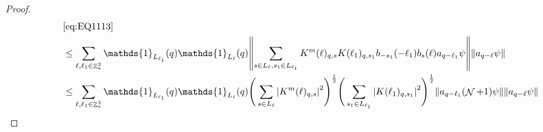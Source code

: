 \documentclass[sn-mathphys, Numbered ,a4paper]{sn-jnl}%
\DeclareMathOperator{\Z}{\mathbb{Z}}
\DeclareMathOperator{\NN}{\mathcal{N}}
\newcommand{\half}{\frac{1}{2}}
\theoremstyle{plain}
\theoremstyle{definition}
\theoremstyle{remark}
\theoremstyle{plain}
\theoremstyle{definition}
\theoremstyle{remark}
\begin{document}
\begin{proof}
\begin{comment}
		&\leq\sum\limits_{\ell, \ell_1\in \Z^3_*} \mathds{1}_{L_{\ell_1}}(q) \mathds{1}_{L_{\ell}}(q) \Bigg(\sum\limits_{s \in L_{\ell}} \abs{K^m(\ell)_{q,s}}^2\Bigg)^\half \Bigg(\sum\limits_{s_1 \in L_{\ell_1}} \abs{K(\ell_1)_{q,s_1}}^2\Bigg)^\half \Bigg(\sum\limits_{s_1 \in L_{\ell_1}}\norm{  b_{-s_1}(-\ell_1) a_{q-\ell_1} \NN^\half\psi}^2\Bigg)^\half \norm{ a_{q-\ell}\psi }\nonumber\\
		&\leq\sum\limits_{\ell \in \Z^3_*} \mathds{1}_{L_{\ell}}(q) \Bigg(\sum\limits_{s \in L_{\ell}} \abs{K^m(\ell)_{q,s}}^2 \Bigg)^\half \Bigg(\sum\limits_{\ell_1 \in \Z^3_*}  \mathds{1}_{L_{\ell_1}}(q) \sum\limits_{s_1 \in L_{\ell_1}} \abs{K(\ell_1)_{q,s_1}}^2 \Bigg)^\half \times \nonumber\\ 
		&\quad \times \Bigg(\sum\limits_{\ell_1 \in \Z^3_*} \mathds{1}_{L_{\ell_1}}(q) \sum\limits_{s_1\in L_{\ell_1}} \norm{ a_{-s_1+\ell_1} a_{-s_1} a_{q-\ell_1} \NN^\half\psi}^2\Bigg)^\half \norm{ a_{q-\ell}\psi }\nonumber\\
		&\leq\sum\limits_{\ell \in \Z^3_*} \norm{  K^{m}(\ell)}_{\mathrm{max,2}}  \Bigg(\sum\limits_{\ell_1 \in \Z^3_*} \norm{K(\ell_1)}_{\mathrm{max,2}}^2 \Bigg)^\half \sup_{q \in \Z^3}\norm{ a_{q} \NN^{\frac{3}{2}}\psi}\Xi^\half \nonumber\\
		&\leq  C \,\Xi^\half \left(\sum\limits_{\ell \in \Z^3_*} \norm{K^m(\ell)}_{\mathrm{max,2}}\right)\Bigg(\sum\limits_{\ell_1 \in \Z^3_*} \norm{K(\ell_1)}_{\mathrm{max,2}}^2 \Bigg)^\half \sup_{q \in \Z^3}\norm{ a_{q} \psi}^\half \norm{ \NN^{\frac{3}{2}}\psi}^\half \nonumber\\
		&\leq  C \,\Xi^{\frac{3}{4}} \left(\sum\limits_{\ell \in \Z^3_*} \norm{K^m(\ell)}_{\mathrm{max,2}}\right)\Bigg(\sum\limits_{\ell_1 \in \Z^3_*} \norm{K(\ell_1)}_{\mathrm{max,2}}^2 \Bigg)^\half  \norm{ \NN^{\frac{3}{2}}\psi}^\half \label{eq:estEQ1113}
	\end{align}
\end{comment}
\begin{align}
	&\eqref{eq:EQ1113}\nonumber\\
	&\leq\sum\limits_{\ell, \ell_1\in \Z^3_*} \mathds{1}_{L_{\ell_1}}(q) \mathds{1}_{L_{\ell}}(q)  \norm{ \sum\limits_{s\in L_{\ell}, s_1 \in L_{\ell_1}} K^m(\ell)_{q,s}K(\ell_1)_{q,s_1} b_{-s_1}(-\ell_1) b_{s}(\ell) a_{q-\ell_1}\psi}\norm{ a_{q-\ell}\psi }\nonumber\\
	&\leq\sum\limits_{\ell, \ell_1\in \Z^3_*} \mathds{1}_{L_{\ell_1}}(q) \mathds{1}_{L_{\ell}}(q) \Bigg(\sum\limits_{s \in L_{\ell}} \abs{K^m(\ell)_{q,s}}^2\Bigg)^\half \Bigg(\sum\limits_{s_1 \in L_{\ell_1}} \abs{K(\ell_1)_{q,s_1}}^2\Bigg)^\half \norm{ a_{q-\ell_1} (\NN+1)\psi} \norm{ a_{q-\ell}\psi }\nonumber\\

\end{align}
\end{proof}
\end{document}
